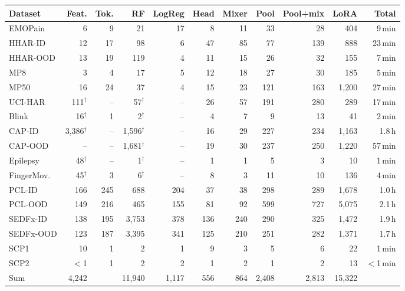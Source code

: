 \begin{tabular}{lrrrrrrrrrr}
\toprule
Dataset & Feat. & Tok. & RF & LogReg & Head & Mixer & Pool & Pool+mix & LoRA & Total \\
\midrule
EMOPain & 6 & 9 & 21 & 17 & 8 & 11 & 33 & 28 & 404 & 9\,min \\
HHAR-ID & 12 & 17 & 98 & 6 & 47 & 85 & 77 & 139 & 888 & 23\,min \\
HHAR-OOD & 13 & 19 & 119 & 4 & 11 & 15 & 26 & 32 & 155 & 7\,min \\
MP8 & 3 & 4 & 17 & 5 & 12 & 18 & 27 & 30 & 185 & 5\,min \\
MP50 & 16 & 24 & 37 & 4 & 15 & 23 & 121 & 163 & 1,200 & 27\,min \\
UCI-HAR & 111$^\dagger$ & -- & 57$^\dagger$ & -- & 26 & 57 & 191 & 280 & 289 & 17\,min \\
Blink & 16$^\dagger$ & 1 & 2$^\dagger$ & -- & 4 & 7 & 9 & 13 & 41 & 2\,min \\
CAP-ID & 3,386$^\dagger$ & -- & 1,596$^\dagger$ & -- & 16 & 29 & 227 & 234 & 1,163 & 1.8\,h \\
CAP-OOD & -- & -- & 1,681$^\dagger$ & -- & 19 & 30 & 237 & 250 & 1,220 & 57\,min \\
Epilepsy & 48$^\dagger$ & -- & 1$^\dagger$ & -- & 1 & 1 & 5 & 3 & 10 & 1\,min \\
FingerMov. & 45$^\dagger$ & 3 & 6$^\dagger$ & -- & 8 & 3 & 11 & 10 & 136 & 4\,min \\
PCL-ID & 166 & 245 & 688 & 204 & 37 & 38 & 298 & 289 & 1,678 & 1.0\,h \\
PCL-OOD & 149 & 216 & 465 & 155 & 81 & 92 & 599 & 727 & 5,075 & 2.1\,h \\
SEDFx-ID & 138 & 195 & 3,753 & 378 & 136 & 240 & 290 & 325 & 1,472 & 1.9\,h \\
SEDFx-OOD & 123 & 187 & 3,395 & 341 & 125 & 210 & 251 & 282 & 1,371 & 1.7\,h \\
SCP1 & 10 & 1 & 2 & 1 & 9 & 3 & 5 & 6 & 22 & 1\,min \\
SCP2 & $<$1 & 1 & 2 & 2 & 1 & 2 & 1 & 2 & 13 & $<$1\,min \\
\midrule
Sum & 4,242 & & 11,940 & 1,117 & 556 & 864 & 2,408 & 2,813 & 15,322 & \\
\bottomrule
\end{tabular}
